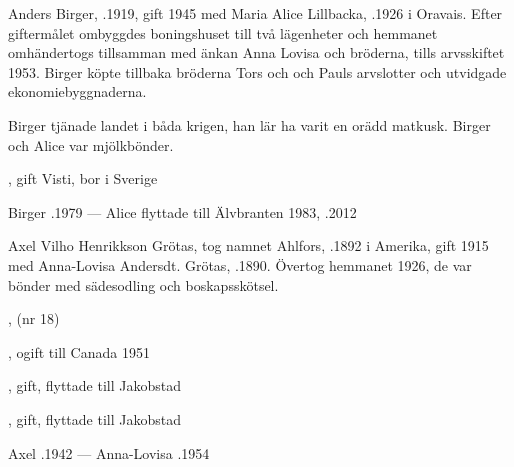 Anders Birger, .1919, gift 1945 med Maria Alice Lillbacka, .1926 i Oravais. Efter giftermålet ombyggdes boningshuset till två lägenheter och hemmanet omhändertogs tillsamman med änkan Anna Lovisa och bröderna, tills arvsskiftet 1953. Birger köpte tillbaka bröderna Tors och och Pauls arvslotter och utvidgade ekonomiebyggnaderna.

Birger tjänade landet i båda krigen, han lär ha varit en orädd matkusk. Birger och Alice var mjölkbönder.
\begin{jhchildren}
  \item {}, gift Visti, bor i Sverige
  \item {}
\end{jhchildren}

Birger .1979  ---  Alice flyttade till Älvbranten 1983, .2012


Axel Vilho Henrikkson Grötas, tog namnet Ahlfors, .1892 i Amerika, gift 1915 med Anna-Lovisa Andersdt. Grötas, .1890. Övertog hemmanet 1926, de var bönder med sädesodling och boskapsskötsel.
\begin{jhchildren}
  \item {}
  \item {}, (nr 18)
  \item {}, ogift till Canada 1951
  \item {}, gift, flyttade till Jakobstad
  \item {}, gift, flyttade till Jakobstad
\end{jhchildren}

Axel .1942  ---  Anna-Lovisa .1954


